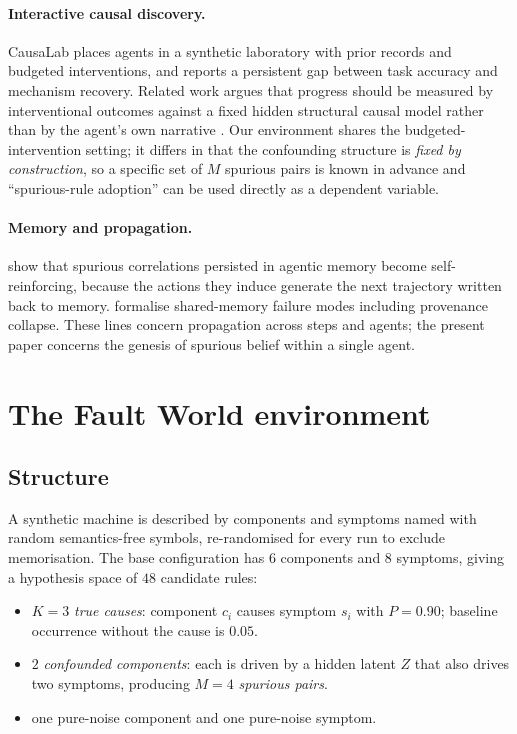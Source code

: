 \documentclass[11pt]{article}
\begin{document}
\paragraph{Interactive causal discovery.} CausaLab \citep{causalab} places agents in a synthetic
laboratory with prior records and budgeted interventions, and reports a persistent gap
between task accuracy and mechanism recovery. Related work argues that progress
should be measured by interventional outcomes against a fixed hidden structural causal model
rather than by the agent's own narrative \citep{interventional}. Our environment shares the budgeted-intervention
setting; it differs in that the confounding structure is \emph{fixed by construction}, so a
specific set of $M$ spurious pairs is known in advance and ``spurious-rule adoption'' can be
used directly as a dependent variable.

\paragraph{Memory and propagation.} \citet{trajectory} show that spurious correlations
persisted in agentic memory become self-reinforcing, because the actions they induce
generate the next trajectory written back to memory. \citet{governedmemory} formalise
shared-memory failure modes including provenance collapse. These lines concern propagation
across steps and agents; the present paper concerns the genesis of spurious belief within a
single agent.

\section{The Fault World environment}

\subsection{Structure}
A synthetic machine is described by components and symptoms named with random
semantics-free symbols, re-randomised for every run to exclude memorisation. The base
configuration has $6$ components and $8$ symptoms, giving a hypothesis space of $48$
candidate rules:

\begin{itemize}\itemsep2pt
\item $K{=}3$ \emph{true causes}: component $c_i$ causes symptom $s_i$ with $P=0.90$;
baseline occurrence without the cause is $0.05$.
\item $2$ \emph{confounded components}: each is driven by a hidden latent $Z$ that also
drives two symptoms, producing $M{=}4$ \emph{spurious pairs}.
\item one pure-noise component and one pure-noise symptom.
\end{itemize}
\end{document}
